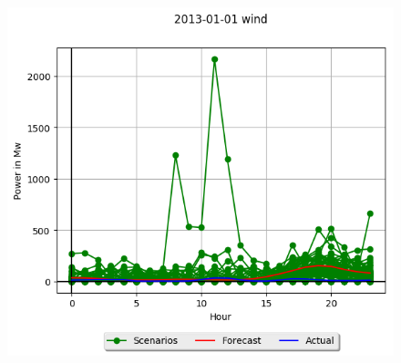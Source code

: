 \documentclass[11pt]{article}
\begin{document}
	\begin{figure}
		\begin{framed}
			
		\end{framed}
	\end{figure}		
	
	\begin{figure}
	\includegraphics{wind.png}
	\end{figure}	
	
\end{document}

